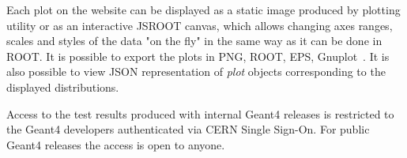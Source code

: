 \begin{itemize}

Each plot on the website can be displayed as a static image produced by plotting utility or as an interactive JSROOT canvas, which allows changing axes ranges, scales and styles of the data "on the fly" in the same way as it can be done in ROOT. It is possible to export the plots in PNG, ROOT, EPS, Gnuplot~\cite{gnuplot}. It is also possible to view JSON representation of \textit{plot} objects corresponding to the displayed distributions.

Access to the test results produced with internal Geant4 releases is restricted to the Geant4 developers authenticated via CERN Single Sign-On. For public Geant4 releases the access is open to anyone.







\end{itemize}
